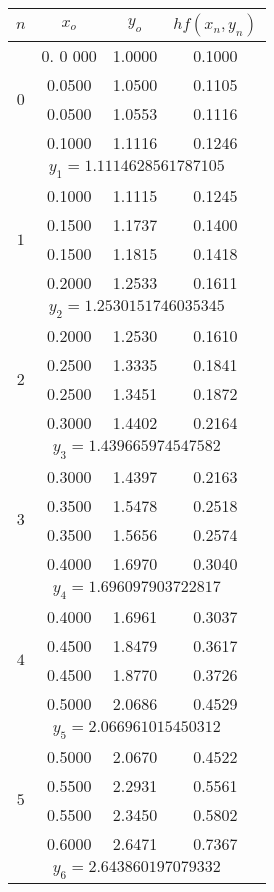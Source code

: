 \begin{longtable}{|c|c|c|c|}\hline
$n$&$x_o$ &$y_o$ &$hf(x_n,y_n)$ \\ \hline
\endhead

\multirow{4}{*}{$0$}
&0. 0 000 &1.0000 &0.1000\\ \cline{2-4}
&0.0500 &1.0500 &0.1105\\ \cline{2-4}
&0.0500 &1.0553 &0.1116\\ \cline{2-4}
&0.1000 &1.1116 &0.1246\\ \hline
\multicolumn{4}{|c|}{$y_1 = 1.1114628561787105$}\\ \hline

\multirow{4}{*}{$1$}
&0.1000 &1.1115 &0.1245\\ \cline{2-4}
&0.1500 &1.1737 &0.1400\\ \cline{2-4}
&0.1500 &1.1815 &0.1418\\ \cline{2-4}
&0.2000 &1.2533 &0.1611\\ \hline
\multicolumn{4}{|c|}{$y_2 = 1.2530151746035345$}\\ \hline

\multirow{4}{*}{$2$}
&0.2000 &1.2530 &0.1610\\ \cline{2-4}
&0.2500 &1.3335 &0.1841\\ \cline{2-4}
&0.2500 &1.3451 &0.1872\\ \cline{2-4}
&0.3000 &1.4402 &0.2164\\ \hline
\multicolumn{4}{|c|}{$y_3 = 1.439665974547582$}\\ \hline

\multirow{4}{*}{$3$}
&0.3000 &1.4397 &0.2163\\ \cline{2-4}
&0.3500 &1.5478 &0.2518\\ \cline{2-4}
&0.3500 &1.5656 &0.2574\\ \cline{2-4}
&0.4000 &1.6970 &0.3040\\ \hline
\multicolumn{4}{|c|}{$y_4 = 1.696097903722817$}\\ \hline

\multirow{4}{*}{$4$}
&0.4000 &1.6961 &0.3037\\ \cline{2-4}
&0.4500 &1.8479 &0.3617\\ \cline{2-4}
&0.4500 &1.8770 &0.3726	\\ \cline{2-4}
&0.5000 &2.0686 &0.4529\\ \hline
\multicolumn{4}{|c|}{$y_5 = 2.066961015450312$}\\ \hline

\multirow{4}{*}{$5$}
&0.5000 &2.0670 &0.4522\\ \cline{2-4}
&0.5500 &2.2931 &0.5561\\ \cline{2-4}
&0.5500 &2.3450 &0.5802\\ \cline{2-4}
&0.6000 &2.6471 &0.7367\\ \hline
\multicolumn{4}{|c|}{$y_6 = 2.643860197079332$}\\ \hline


\end{longtable}
